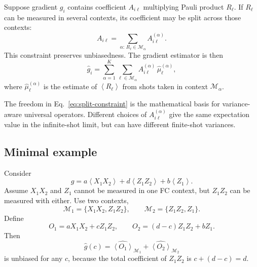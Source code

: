 \documentclass[11pt]{article}
\newcommand{\expect}[1]{\left\langle #1\right\rangle}
\begin{document}
Suppose gradient $g_i$ contains coefficient $A_{i\ell}$ multiplying Pauli product $R_\ell$. If $R_\ell$ can be measured in several contexts, its coefficient may be split across those contexts:
\begin{equation}
    A_{i\ell} = \sum_{\alpha:\,R_\ell\in\mathcal M_\alpha} A^{(\alpha)}_{i\ell}.
    \label{eq:split-constraint}
\end{equation}
This constraint preserves unbiasedness. The gradient estimator is then
\begin{equation}
    \widehat g_i
    =
    \sum_{\alpha=1}^{K}
    \sum_{\ell\in\mathcal M_\alpha}
    A^{(\alpha)}_{i\ell}\,\widehat\mu^{(\alpha)}_\ell,
    \label{eq:split-estimator}
\end{equation}
where $\widehat\mu^{(\alpha)}_\ell$ is the estimate of $\expect{R_\ell}$ from shots taken in context $\mathcal M_\alpha$.

The freedom in Eq.~\eqref{eq:split-constraint} is the mathematical basis for variance-aware universal operators. Different choices of $A^{(\alpha)}_{i\ell}$ give the same expectation value in the infinite-shot limit, but can have different finite-shot variances.

\subsection{Minimal example}

Consider
\begin{equation}
    g = a\expect{X_1X_2}+d\expect{Z_1Z_2}+b\expect{Z_1}.
\end{equation}
Assume $X_1X_2$ and $Z_1$ cannot be measured in one FC context, but $Z_1Z_2$ can be measured with either. Use two contexts,
\begin{equation}
    \mathcal M_1=\{X_1X_2,Z_1Z_2\},
    \qquad
    \mathcal M_2=\{Z_1Z_2,Z_1\}.
\end{equation}
Define
\begin{equation}
    O_1 = aX_1X_2+cZ_1Z_2,
    \qquad
    O_2 = (d-c)Z_1Z_2+bZ_1.
\end{equation}
Then
\begin{equation}
    \widehat g(c)=\widehat{\expect{O_1}}_{\mathcal M_1}+\widehat{\expect{O_2}}_{\mathcal M_2}
\end{equation}
is unbiased for any $c$, because the total coefficient of $Z_1Z_2$ is $c+(d-c)=d$.
\end{document}
